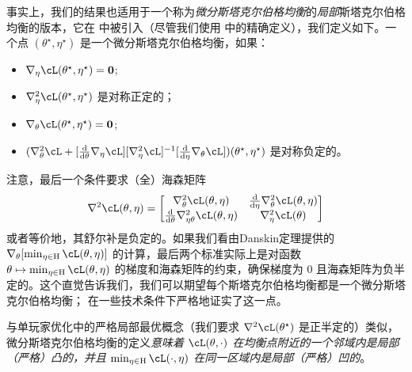 \documentclass[../../book-main_zh.tex]{subfiles}
\begin{document}
事实上，我们的结果也适用于一个称为\textit{微分斯塔克尔伯格均衡}的\textit{局部}斯塔克尔伯格均衡的版本，它在 \cite{fiez2019convergence} 中被引入（尽管我们使用 \cite{li2022convergence} 中的精确定义），我们定义如下。一个点 \((\theta^{\star}, \eta^{\star})\) 是一个微分斯塔克尔伯格均衡，如果：
\begin{itemize}
    \item \(\nabla_{\eta}\cL(\theta^{\star}, \eta^{\star}) = \vzero\);
    \item \(\nabla_{\eta}^{2}\cL(\theta^{\star}, \eta^{\star})\) 是对称正定的；
    \item \(\nabla_{\theta}\cL(\theta^{\star}, \eta^{\star}) = \vzero\);
    \item \((\nabla_{\theta}^{2}\cL + [\odv*{\nabla_{\eta}\cL}{\theta}][\nabla_{\eta}^{2}\cL]^{-1}[\odv*{\nabla_{\theta}\cL}{\eta}])(\theta^{\star}, \eta^{\star})\) 是对称负定的。
\end{itemize}
注意，最后一个条件要求（全）海森矩阵
\begin{equation}
    \nabla^{2} \cL(\theta, \eta) = \mat{\nabla_{\theta}^{2}\cL(\theta, \eta) & \odv*{\nabla_{\theta}^{2}\cL(\theta, \eta)}{\eta} \\ \odv*{\nabla_{\eta\theta}^{2}\cL(\theta, \eta)}{\theta} & \nabla_{\eta}^{2}\cL(\theta)}
\end{equation}
或者等价地，其舒尔补是负定的。如果我们看由Danskin定理提供的 \(\nabla_{\theta}[\min_{\eta \in \Eta}\cL(\theta, \eta)]\) 的计算，最后两个标准实际上是对函数 \(\theta \mapsto \min_{\eta \in \Eta}\cL(\theta, \eta)\) 的梯度和海森矩阵的约束，确保梯度为 \(0\) 且海森矩阵为负半定的。这个直觉告诉我们，我们可以期望每个斯塔克尔伯格均衡都是一个微分斯塔克尔伯格均衡；\cite{fiez2020implicit} 在一些技术条件下严格地证实了这一点。

与单玩家优化中的严格局部最优概念（我们要求 \(\nabla^{2}\cL(\theta^{\star})\) 是正半定的）类似，微分斯塔克尔伯格均衡的定义\textit{意味着 \(\cL(\theta, \cdot)\) 在均衡点附近的一个邻域内是局部（严格）凸的，并且 \(\min_{\eta \in \Eta}\cL(\cdot, \eta)\) 在同一区域内是局部（严格）凹的}。
\end{document}
